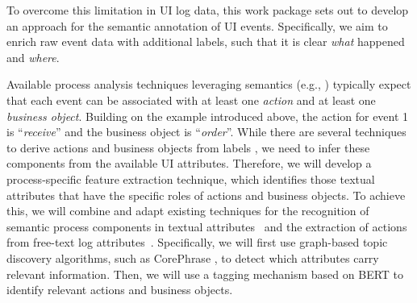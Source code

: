 To overcome this limitation in UI log data, this work package sets out to develop an approach for the semantic annotation of UI events. Specifically, we aim to enrich raw event data with additional labels, such that it is clear \textit{what} happened and \textit{where}. 

 Available process analysis techniques leveraging semantics (e.g., \cite{leopold2012probabilistic,leopold2015_jss,van2021natural}) typically expect that each event can be associated with at least one \textit{action} and at least one \textit{business object}. Building on the example introduced above, the action for event 1 is ``\textit{receive}'' and the business object is ``\textit{order}''. While there are several techniques to derive actions and business objects from labels \cite{leopold2012refactoring,leopold2019using,rebmann2021extracting}, we need to infer these components from the available UI attributes. Therefore, we will develop a process-specific feature extraction technique, which identifies those textual attributes that have the specific roles of actions and business objects. To achieve this, we will combine and adapt existing techniques for the recognition of semantic process components in textual attributes~\cite{rebmann2021extracting} and the extraction of actions from free-text log attributes~\cite{gupta2020analyzing}. Specifically, we will first use graph-based topic discovery algorithms, such as CorePhrase \cite{hammouda2005corephrase}, to detect which attributes carry relevant information. Then, we will use a tagging mechanism based on BERT \cite{Devlin2019} to identify relevant actions and business objects. 

